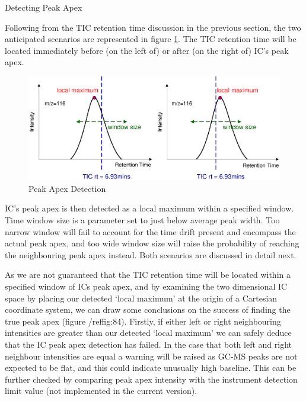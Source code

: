 Detecting Peak Apex

Following from the TIC retention time discussion in the previous section, the 
two anticipated scenarios are represented in figure \ref{fig:83}. The TIC retention 
time will be located immediately before (on the left of) or after 
(on the right of) IC’s peak apex.

\begin{figure}
  \begin{center}
    \includegraphics[scale=1]{graphics/chapter08/83.eps}
  \end{center}
  \caption{Peak Apex Detection}
  \label{fig:83}
\end{figure}


IC’s peak apex is then detected as a local maximum within a specified window. 
Time window size is a parameter set to just below average peak width. Too narrow 
window will fail to account for the time drift present and encompass the actual 
peak apex, and too wide window size will raise the probability of reaching the 
neighbouring peak apex instead. Both scenarios are discussed in detail next. 

As we are not guaranteed that the TIC retention time will be located within a 
specified window of ICs peak apex, and by examining the two dimensional IC 
space by placing our detected ‘local maximum’ at the origin of a Cartesian 
coordinate system, we can draw some conclusions on the success of finding the 
true peak apex (figure /ref{fig:84}). Firstly, if either left or right neighbouring intensities are 
greater than our detected ‘local maximum’ we can safely deduce that the IC peak 
apex detection has failed. In the case that both left and right neighbour 
intensities are equal a warning will be raised as GC-MS peaks are not expected 
to be flat, and this could indicate unusually high baseline. This can be further 
checked by comparing peak apex intensity with the instrument detection limit 
value (not implemented in the current version).

